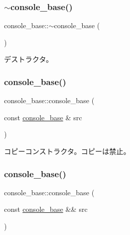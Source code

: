 \subsubsection{\texorpdfstring{$\sim$console\+\_\+base()}{~console\_base()}}
{\footnotesize\ttfamily console\+\_\+base\+::$\sim$console\+\_\+base (\begin{DoxyParamCaption}{ }\end{DoxyParamCaption})\hspace{0.3cm}{\ttfamily [virtual]}}

デストラクタ。 \hypertarget{classconsole__base_a103e9d972e533b0f09d50dac22edf09f}{}\label{classconsole__base_a103e9d972e533b0f09d50dac22edf09f} 
\subsubsection{\texorpdfstring{console\+\_\+base()}{console\_base()}\hspace{0.1cm}{\footnotesize\ttfamily [2/3]}}
{\footnotesize\ttfamily console\+\_\+base\+::console\+\_\+base (\begin{DoxyParamCaption}\item[{const \hyperlink{classconsole__base}{console\+\_\+base} \&}]{src }\end{DoxyParamCaption})\hspace{0.3cm}{\ttfamily [delete]}}

コピーコンストラクタ。コピーは禁止。 \hypertarget{classconsole__base_a9f82b2ea08cdbb111e0970eadbe8d7bf}{}\label{classconsole__base_a9f82b2ea08cdbb111e0970eadbe8d7bf} 
\subsubsection{\texorpdfstring{console\+\_\+base()}{console\_base()}\hspace{0.1cm}{\footnotesize\ttfamily [3/3]}}
{\footnotesize\ttfamily console\+\_\+base\+::console\+\_\+base (\begin{DoxyParamCaption}\item[{const \hyperlink{classconsole__base}{console\+\_\+base} \&\&}]{src }\end{DoxyParamCaption})\hspace{0.3cm}{\ttfamily [delete]}}

